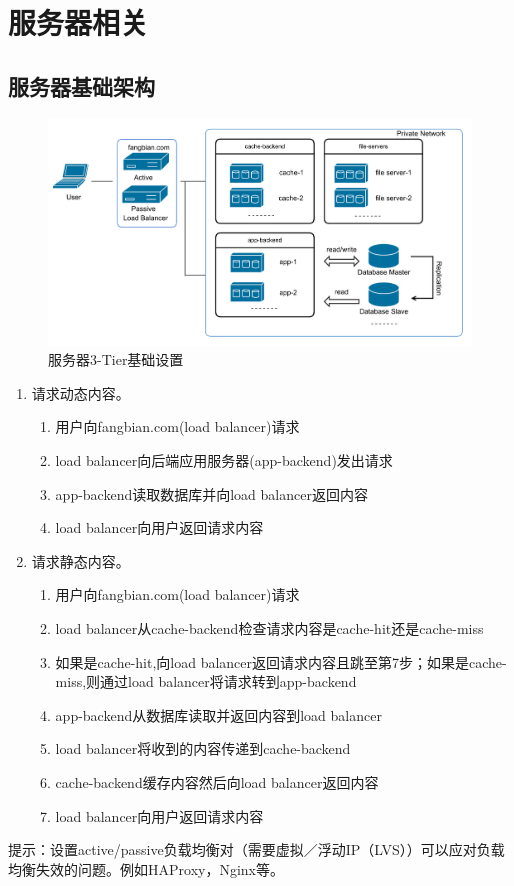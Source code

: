 \section{服务器相关}
\subsection{服务器基础架构}
\begin{figure}[H]
	\centering
	\includegraphics[width=1.0\textwidth]{graphics/diagramsvg.pdf}
	\caption{服务器3-Tier基础设置}
	\label{fig:hs}
\end{figure}

\begin{enumerate}[label=(\alph*)]
   \item 请求动态内容。
     \begin{enumerate}[label=(\arabic*)]
       \item 用户向fangbian.com(load balancer)请求
       \item load balancer向后端应用服务器(app-backend)发出请求
       \item app-backend读取数据库并向load balancer返回内容
       \item load balancer向用户返回请求内容
     \end{enumerate}

   \item 请求静态内容。
     \begin{enumerate}[label=(\arabic*)]
       \item 用户向fangbian.com(load balancer)请求
       \item load balancer从cache-backend检查请求内容是cache-hit还是cache-miss
       \item 如果是cache-hit,向load balancer返回请求内容且跳至第7步；如果是cache-miss,则通过load balancer将请求转到app-backend
       \item app-backend从数据库读取并返回内容到load balancer
       \item load balancer将收到的内容传递到cache-backend 
       \item cache-backend缓存内容然后向load balancer返回内容
       \item load balancer向用户返回请求内容
     \end{enumerate}
\end{enumerate}
\par 提示：设置active/passive负载均衡对（需要虚拟／浮动IP（LVS））可以应对负载均衡失效的问题。例如HAProxy，Nginx等。

